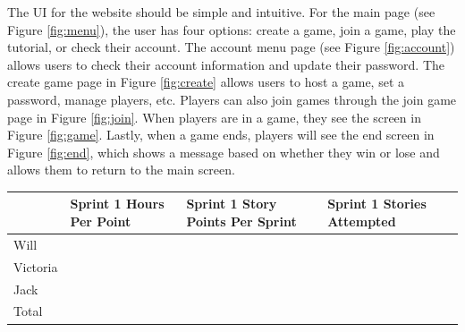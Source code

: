 \documentclass{article}
\begin{document}
The UI for the website should be simple and intuitive. For the main page (see Figure \ref{fig:menu}), the user has four options: create a game, join a game, play the tutorial, or check their account. The account menu page (see Figure \ref{fig:account}) allows users to check their account information and update their password. The create game page in Figure \ref{fig:create} allows users to host a game, set a password, manage players, etc. Players can also join games through the join game page in Figure \ref{fig:join}. When players are in a game, they see the screen in Figure \ref{fig:game}. Lastly, when a game ends, players will see the end screen in Figure \ref{fig:end}, which shows a message based on whether they win or lose and allows them to return to the main screen.

\begin{table}[]
\begin{tabular}{|l|l|l|l|}
\hline
         & Sprint 1 Hours Per Point & Sprint 1 Story Points Per Sprint & Sprint 1 Stories Attempted \\ \hline
Will     &                          &                                  &                            \\ \hline
Victoria &                          &                                  &                            \\ \hline
Jack     &                          &                                  &                            \\ \hline
Total    &                          &                                  &                            \\ \hline
\end{tabular}
\end{table}
\end{document}
